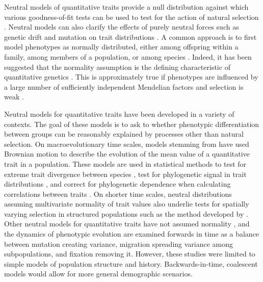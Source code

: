 Neutral models of quantitative traits provide a null distribution against which
various goodness-of-fit tests can be used to test for the action of natural
selection \citep{Lande1976,Leinonen2013}. Neutral models can also clarify the
effects of purely neutral forces such as genetic drift and mutation on trait
distributions \citep{Lynch1986}. A common approach is to first model phenotypes
as normally distributed, either among offspring within a family, among members
of a population, or among species \citep{Turelli2017}. Indeed, it has been
suggested that the normality assumption is the defining characteristic of
quantitative genetics \citep{Rice2004}. This is approximately true if phenotypes
are influenced by a large number of sufficiently independent Mendelian factors
\citep{Fisher1918} and selection is weak \citep{Turelli1990}.

Neutral models for quantitative traits have been developed in a variety of
contexts. The goal of these models is to ask to whether phenotypic
differentiation between groups can be reasonably explained by processes other
than natural selection. On macroevolutionary time scales, models stemming
from \citet{Lande1976} have used Brownian motion to describe the evolution of
the mean value of a quantitative trait in a population. These models are used in
statistical methods to test for extreme trait divergence between
species \citep{Turelli1988}, test for phylogenetic signal in trait
distributions \citep{Freckleton2002}, and correct for phylogenetic dependence
when calculating correlations between traits \citep{Felsenstein1985}. On shorter
time scales, neutral distributions assuming multivariate normality of trait
values also underlie tests for spatially varying selection in structured
populations such as the method developed by \citet{Ovaskainen2011}. Other
neutral models for quantitative traits have not assumed
normality \citep{Chakraborty1982,Lynch1986,Lande1992}, and the dynamics of
phenotypic evolution are examined forwards in time as a balance between mutation
creating variance, migration spreading variance among subpopulations, and
fixation removing it. However, these studies were limited to simple models of
population structure and history. Backwards-in-time, coalescent models would
allow for more general demographic scenarios.

